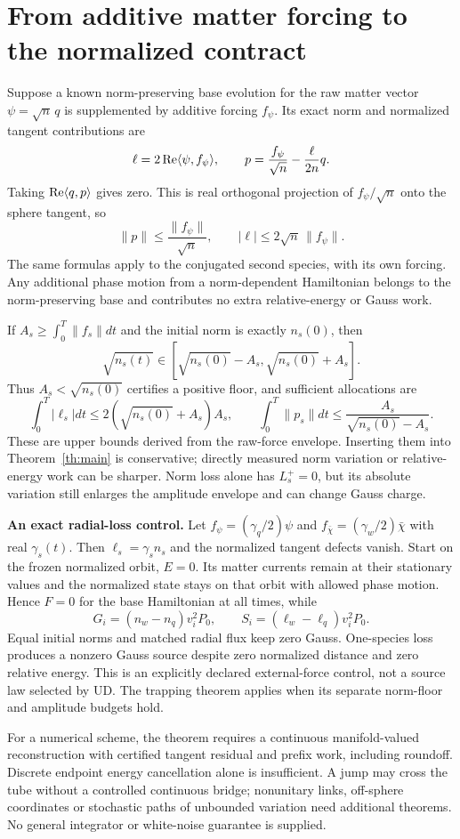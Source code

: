 \documentclass[11pt,a4paper]{article}
\begin{document}
\section{From additive matter forcing to the normalized contract}
Suppose a known norm-preserving base evolution for the raw matter vector $\psi=\sqrt n\,q$ is supplemented by additive forcing $f_\psi$. Its exact norm and normalized tangent contributions are
\[
\ell=2\operatorname{Re}\langle\psi,f_\psi\rangle,
\qquad p=\frac{f_\psi}{\sqrt n}-\frac{\ell}{2n}q.
\]
Taking $\operatorname{Re}\langle q,p\rangle$ gives zero. This is real orthogonal projection of $f_\psi/\sqrt n$ onto the sphere tangent, so
\[
\|p\|\le\frac{\|f_\psi\|}{\sqrt n},\qquad
|\ell|\le2\sqrt n\,\|f_\psi\|.
\]
The same formulas apply to the conjugated second species, with its own forcing. Any additional phase motion from a norm-dependent Hamiltonian belongs to the norm-preserving base and contributes no extra relative-energy or Gauss work.

If $A_s\ge\int_0^T\|f_s\|dt$ and the initial norm is exactly $n_s(0)$, then
\[
\sqrt{n_s(t)}\in[\sqrt{n_s(0)}-A_s,\sqrt{n_s(0)}+A_s].
\]
Thus $A_s<\sqrt{n_s(0)}$ certifies a positive floor, and sufficient allocations are
\[
\int_0^T|\ell_s|dt\le2(\sqrt{n_s(0)}+A_s)A_s,
\qquad \int_0^T\|p_s\|dt\le\frac{A_s}{\sqrt{n_s(0)}-A_s}.
\]
These are upper bounds derived from the raw-force envelope. Inserting them into Theorem~\ref{th:main} is conservative; directly measured norm variation or relative-energy work can be sharper. Norm loss alone has $L_s^+=0$, but its absolute variation still enlarges the amplitude envelope and can change Gauss charge.

\textbf{An exact radial-loss control.} Let $f_\psi=(\gamma_q/2)\psi$ and $f_{\bar\chi}=(\gamma_w/2)\bar\chi$ with real $\gamma_s(t)$. Then $\ell_s=\gamma_s n_s$ and the normalized tangent defects vanish. Start on the frozen normalized orbit, $E=0$. Its matter currents remain at their stationary values and the normalized state stays on that orbit with allowed phase motion. Hence $F=0$ for the base Hamiltonian at all times, while
\[
G_i=(n_w-n_q)v_i^2P_0,\qquad
S_i=(\ell_w-\ell_q)v_i^2P_0.
\]
Equal initial norms and matched radial flux keep zero Gauss. One-species loss produces a nonzero Gauss source despite zero normalized distance and zero relative energy. This is an explicitly declared external-force control, not a source law selected by UD. The trapping theorem applies when its separate norm-floor and amplitude budgets hold.

For a numerical scheme, the theorem requires a continuous manifold-valued reconstruction with certified tangent residual and prefix work, including roundoff. Discrete endpoint energy cancellation alone is insufficient. A jump may cross the tube without a controlled continuous bridge; nonunitary links, off-sphere coordinates or stochastic paths of unbounded variation need additional theorems. No general integrator or white-noise guarantee is supplied.
\newpage
\end{document}
